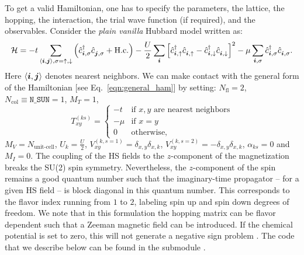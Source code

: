 To get a valid Hamiltonian, one has to specify the parameters, the lattice, the hopping, the interaction, the trial wave function  (if  required), and the observables.  Consider  the  \textit{plain vanilla}  Hubbard model  written as: 
\begin{equation}
\label{eqn_hubbard_Mz}
\mathcal{H}=
- t 
\sum\limits_{\langle \ve{i}, \ve{j} \rangle,  \sigma={\uparrow,\downarrow}} 
  \left(  \hat{c}^{\dagger}_{\ve{i}, \sigma} \hat{c}^{\phantom\dagger}_{\ve{j},\sigma}  + \hc \right) 
- \frac{U}{2}\sum\limits_{\ve{i}}\left[
\hat{c}^{\dagger}_{\ve{i}, \uparrow} \hat{c}^{\phantom\dagger}_{\ve{i}, \uparrow}  -   \hat{c}^{\dagger}_{\ve{i}, \downarrow} \hat{c}^{\phantom\dagger}_{\ve{i}, \downarrow}  \right]^{2}   
-  \mu \sum_{\ve{i},\sigma } \hat{c}^{\dagger}_{\ve{i}, \sigma}  \hat{c}^{\phantom\dagger}_{\ve{i},\sigma}. 
\end{equation} 
Here $ \langle \boldsymbol{i}, \boldsymbol{j} \rangle $    denotes nearest neighbors. 
We can make contact with the general form of the Hamiltonian  [see Eq.~\eqref{eqn:general_ham}] by setting: 
$N_{\mathrm{fl}} = 2$, $N_{\mathrm{col}} \equiv \texttt{N\_SUN}     =1 $, 
 $M_T    =    1$, 
 \begin{equation}
  T^{(ks)}_{x y}   = 
  \left\{ 
 \begin{array}{ll}
       -t         & \text{if } x,y \text{ are nearest neighbors} \\
       -\mu    & \text{if } x = y \\
       0         &  \text{otherwise},
 \end{array}
  \right.
 \end{equation}
 $M_V   =  N_{\text{unit-cell}} $,  $U_{k}       =   \frac{U}{2}$, 
 $V_{x y}^{(k, s=1)} =  \delta_{x,y} \delta_{x,k}  $,  $V_{x y}^{(k, s=2)} =  - \delta_{x,y} \delta_{x,k}  $,  $\alpha_{ks}   = 0  $ and $M_I       = 0 $.   
The coupling of the HS fields to the $z$-component of the magnetization breaks the SU(2) spin symmetry. Nevertheless, the $z$-component of the spin remains a good quantum number such that the imaginary-time propagator -- for a given HS field -- is block  diagonal in this quantum number. This corresponds to the flavor index running from $1$ to $2$,  labeling spin up and spin down degrees of freedom. We note that  in this formulation the  hopping matrix can be flavor dependent such that a Zeeman  magnetic field can be introduced.  If the chemical potential is set to zero, this will not generate a negative sign problem \cite{Wu04,Milat04,Bercx09}.    
The code that we describe below  can be found in the submodule .

